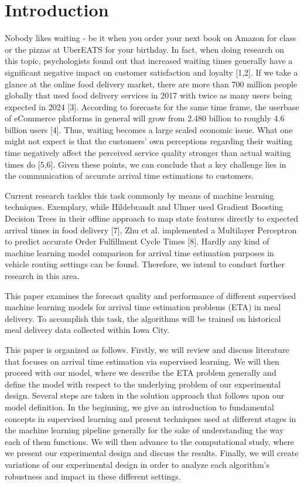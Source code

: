 \chapter{Introduction}

Nobody likes waiting - be it when you order your next book on Amazon for class or the pizzas at UberEATS for your birthday. In fact, when doing research on this topic, psychologists found out that increased waiting times generally have a significant negative impact on customer satisfaction and loyalty [1,2]. If we take a glance at the online food delivery market, there are more than 700 million people globally that used food delivery services in 2017 with twice as many users being expected in 2024 [3]. According to forecasts for the same time frame, the userbase of eCommerce platforms in general will grow from 2.480 billion to roughly 4.6 billion users [4]. Thus, waiting becomes a large scaled economic issue. What one might not expect is that the customers’ own perceptions regarding their waiting time negatively affect the perceived service quality stronger than actual waiting times do [5,6]. Given these points, we can conclude that a key challenge lies in the communication of accurate arrival time estimations to customers. 

Current research tackles this task commonly by means of machine learning techniques. Exemplary, while Hildebrandt and Ulmer used Gradient Boosting Decision Trees in their offline approach to map state features directly to expected arrival times in food delivery [7], Zhu et al. implemented a Multilayer Perceptron to predict accurate Order Fulfillment Cycle Times [8]. Hardly any kind of machine learning model comparison for arrival time estimation purposes in vehicle routing settings can be found. Therefore, we intend to conduct further research in this area.  

This paper examines the forecast quality and performance of different supervised machine learning models for arrival time estimation problems (ETA) in meal delivery. To accomplish this task, the algorithms will be trained on historical meal delivery data collected within Iowa City. 

This paper is organized as follows. Firstly, we will review and discuss literature that focuses on arrival time estimation via supervised learning. We will then proceed with our model, where we describe the ETA problem generally and define the model with respect to the underlying problem of our experimental design. Several steps are taken in the solution approach that follows upon our model definition. In the beginning, we give an introduction to fundamental concepts in supervised learning and present techniques used at different stages in the machine learning pipeline generally for the sake of understanding the way each of them functions. We will then advance to the computational study, where we present our experimental design and discuss the results. Finally, we will create variations of our experimental design in order to analyze each algorithm’s robustness and impact in these different settings.